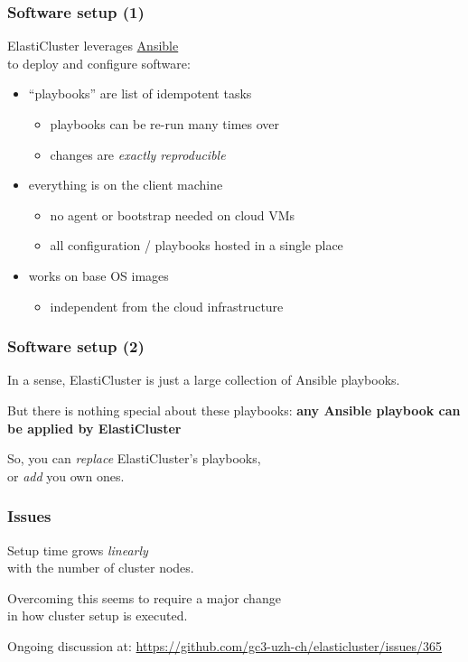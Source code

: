 \documentclass[english,serif,mathserif,usenames,dvipsnames]{beamer}
\begin{document}
\begin{frame}
  \frametitle{Software setup (1)}

  ElastiCluster leverages \href{http://www.ansible.com}{Ansible} \\
  to deploy and configure software:
  \begin{itemize}
  \item ``playbooks'' are list of idempotent tasks
    \begin{itemize}
    \item playbooks can be re-run many times over
    \item changes are \textit{exactly reproducible}
    \end{itemize}

  \item everything is on the client machine
    \begin{itemize}
    \item no agent or bootstrap needed on cloud VMs
    \item all configuration / playbooks hosted in a single place
    \end{itemize}

  \item works on base OS images
    \begin{itemize}
    \item independent from the cloud infrastructure
    \end{itemize}
  \end{itemize}
\end{frame}


\begin{frame}
  \frametitle{Software setup (2)}
  In a sense, ElastiCluster is just a large collection of Ansible playbooks.

  \+ But there is nothing special about these playbooks: \textbf{any Ansible
    playbook can be applied by ElastiCluster}

  \+ So, you can \emph{replace} ElastiCluster's playbooks, \\
  or \emph{add} you own ones.
\end{frame}


\begin{frame}
  \frametitle{Issues}
  Setup time grows \emph{linearly} \\ with the number of cluster nodes.

  \+
  Overcoming this seems to require a major change \\ in how cluster setup is
  executed.

  \+
  Ongoing discussion at: \url{https://github.com/gc3-uzh-ch/elasticluster/issues/365}
\end{frame}
\end{document}
